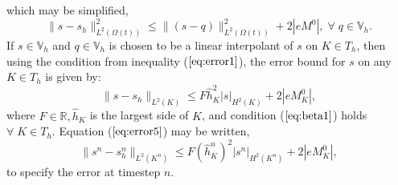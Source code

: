 \documentclass[11pt]{article}
\newcommand{\bigv}{\mathbb{V}}
\newcommand{\Om}{\Omega}
\begin{document}
which may be simplified,
\begin{equation}
\label{eq:err_s}
\|s-s_h\|_{L^2(\Om(t))}^2 \leq \|(s-q)\|_{L^2(\Om(t))}^2  + 2|eM^0|, \;\forall\;q\in\bigv_h.
\end{equation}
If $s\in\bigv_h$ and $q \in\bigv_h$ is chosen to be a linear interpolant of $s$ on $K\in T_h$, then using the condition from inequality ($\ref{eq:error1}$), the error bound for $s$ on any $K\in{T_h}$ is given by:
\begin{equation}
\label{eq:error5}
\|s-s_h\|_{L^2(K)} \leq F\hat{h}_K^2|s|_{H^2(K)} + 2|eM_K^0|,
\end{equation}
where $F\in\mathbb{R},\hat{h}_K$ is the largest side of $K$, and condition ($\ref{eq:beta1}$) holds $\forall\;{K}\in{T}_h$.
Equation ($\ref{eq:error5}$) may be written,
\begin{equation}
\label{eq:error6}
\|s^n-s_h^n\|_{L^2(K^n)} \leq F(\hat{h}^n_K)^2|s^n|_{H^2(K^n)} + 2|eM_K^0|,
\end{equation}
to specify the error at timestep $n$.
\end{document}
